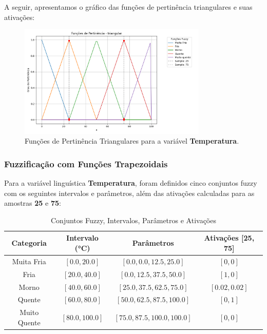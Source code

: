\documentclass[a4paper,12pt]{article}
\begin{document}
A seguir, apresentamos o gráfico das funções de pertinência triangulares e suas ativações:

\begin{figure}[H]
    \centering
    \includegraphics[width=0.8\textwidth]{img/funções_de_pertinência_triangular_fuzzificado.png}
    \caption{Funções de Pertinência Triangulares para a variável \textbf{Temperatura}.}
\end{figure}


\subsubsection{Fuzzificação com Funções Trapezoidais}

Para a variável linguística \textbf{Temperatura}, foram definidos cinco conjuntos fuzzy com os seguintes intervalos e parâmetros, além das ativações calculadas para as amostras \textbf{25} e \textbf{75}:

\begin{table}[H]
\centering
\caption{Conjuntos Fuzzy, Intervalos, Parâmetros e Ativações}
\begin{tabular}{|c|c|c|c|}
\hline
\textbf{Categoria}    & \textbf{Intervalo (°C)} & \textbf{Parâmetros}               & \textbf{Ativações [25, 75]} \\ \hline
Muita Fria            & $[0.0, 20.0]$          & $[0.0, 0.0, 12.5, 25.0]$         & $[0, 0]$                   \\ \hline
Fria                  & $[20.0, 40.0]$         & $[0.0, 12.5, 37.5, 50.0]$        & $[1, 0]$                   \\ \hline
Morno                 & $[40.0, 60.0]$         & $[25.0, 37.5, 62.5, 75.0]$       & $[0.02, 0.02]$             \\ \hline
Quente                & $[60.0, 80.0]$         & $[50.0, 62.5, 87.5, 100.0]$      & $[0, 1]$                   \\ \hline
Muito Quente          & $[80.0, 100.0]$        & $[75.0, 87.5, 100.0, 100.0]$     & $[0, 0]$                   \\ \hline
\end{tabular}
\end{table}
\end{document}
